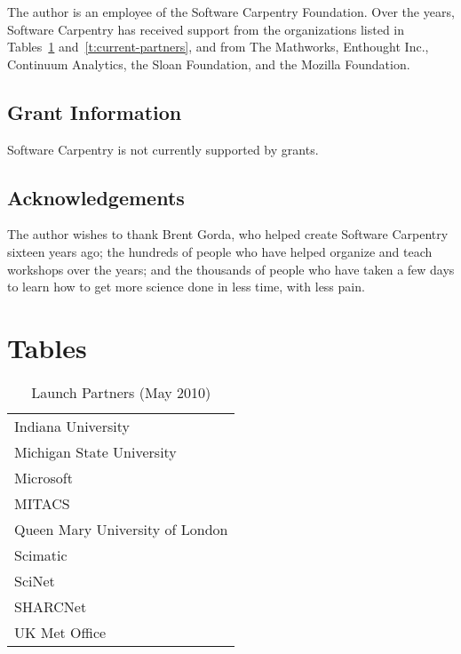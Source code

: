 \documentclass[10pt,a4paper,twocolumn]{article}
\begin{document}
The author is an employee of the Software Carpentry Foundation. Over
the years, Software Carpentry has received support from the
organizations listed in Tables~\ref{t:launch-partners}
and~\ref{t:current-partners}, and from The Mathworks, Enthought Inc.,
Continuum Analytics, the Sloan Foundation, and the Mozilla Foundation.

\subsection{Grant Information}

Software Carpentry is not currently supported by grants.

\subsection{Acknowledgements}

The author wishes to thank Brent Gorda, who helped create Software
Carpentry sixteen years ago; the hundreds of people who have helped
organize and teach workshops over the years; and the thousands of
people who have taken a few days to learn how to get more science
done in less time, with less pain.

\section{Tables}

\begin{table}[h]
\begin{tabular}{l}
Indiana University \\
Michigan State University \\
Microsoft \\
MITACS \\
Queen Mary University of London \\
Scimatic \\
SciNet \\
SHARCNet \\
UK Met Office \\
\end{tabular}
\caption{Launch Partners (May 2010)}
\label{t:launch-partners}
\end{table}
\end{document}

